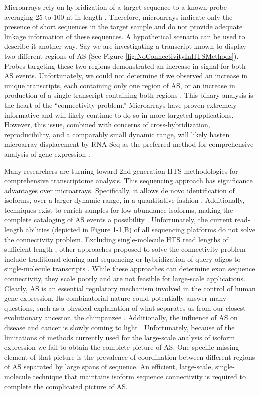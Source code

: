 Microarrays rely on hybridization of a target sequence to a known probe averaging 25 to 100 nt in length \citep{Southern2001}. Therefore, microarrays indicate only the presence of short sequences in the target sample and do not provide adequate linkage information of these sequences. A hypothetical scenario can be used to describe it another way. Say we are investigating a transcript known to display two different regions of AS (See Figure \ref{fig:NoConnectivityInHTSMethods}). Probes targeting these two regions demonstrated an increase in signal for both AS events. Unfortunately, we could not determine if we observed an increase in unique transcripts, each containing only one region of AS, or an increase in production of a single transcript containing both regions \citep{Calarco2007}. This binary analysis is the heart of the ``connectivity problem.'' Microarrays have proven extremely informative and will likely continue to do so in more targeted applications. However, this issue, combined with concerns of cross-hybridization, reproducibility, and a comparably small dynamic range, will likely hasten microarray displacement by RNA-Seq as the preferred method for comprehensive analysis of gene expression \citep{Shendure2008}.

Many researchers are turning toward 2nd generation HTS methodologies for comprehensive transcriptome analysis. This sequencing approach has significance advantages over microarrays. Specifically, it allows de novo identification of isoforms, over a larger dynamic range, in a quantitative fashion \citep{Mortazavi2008}. Additionally, techniques exist to enrich samples for low-abundance isoforms, making the complete cataloging of AS events a possibility \citep{Djebali2008, Salehi-Ashtiani2008}. Unfortunately, the current read-length abilities (depicted in Figure 1-1,B) of all sequencing platforms do not solve the connectivity problem. Excluding single-molecule HTS read lengths of sufficient length \citep{Shendure2004}, other approaches proposed to solve the connectivity problem include traditional cloning and sequencing or hybridization of query oligos to single-molecule transcripts \citep{Zhu2003, Calarco2007, Emerick2007}. While these approaches can determine exon sequence connectivity, they scale poorly and are not feasible for large-scale applications. 
Clearly, AS is an essential regulatory mechanism involved in the control of human gene expression. Its combinatorial nature could potentially answer many questions, such as a physical explanation of what separates us from our closest evolutionary ancestor, the chimpanzee \citep{Calarco2007a}. Additionally, the influence of AS on disease and cancer is slowly coming to light \citep{Tazi2009}. Unfortunately, because of the limitations of methods currently used for the large-scale analysis of isoform expression we fail to obtain the complete picture of AS. One specific missing element of that picture is the prevalence of coordination between different regions of AS separated by large spans of sequence. An efficient, large-scale, single-molecule technique that maintains isoform sequence connectivity is required to complete the complicated picture of AS.

